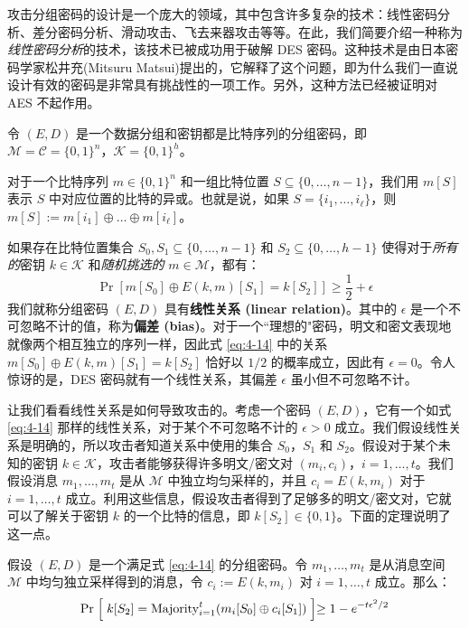 攻击分组密码的设计是一个庞大的领域，其中包含许多复杂的技术：线性密码分析、差分密码分析、滑动攻击、飞去来器攻击等等。在此，我们简要介绍一种称为\emph{线性密码分析}的技术，该技术已被成功用于破解 DES 密码。这种技术是由日本密码学家松井充(Mitsuru Matsui)提出的，它解释了这个问题，即为什么我们一直说设计有效的密码是非常具有挑战性的一项工作。另外，这种方法已经被证明对 AES 不起作用。

\begin{snote}[线性密码分析。]
令 $(E,D)$ 是一个数据分组和密钥都是比特序列的分组密码，即 $\mathcal{M}=\mathcal{C}=\{0,1\}^n$，$\mathcal{K}=\{0,1\}^h$。

对于一个比特序列 $m\in\{0,1\}^n$ 和一组比特位置 $S\subseteq\{0,\dots,n-1\}$，我们用 $m[S]$ 表示 $S$ 中对应位置的比特的异或。也就是说，如果 $S=\{i_1,\dots,i_\ell\}$，则 $m[S]:=m[i_1]\oplus\dots\oplus m[i_\ell]$。

如果存在比特位置集合 $S_0,S_1\subseteq\{0,\dots,n-1\}$ 和 $S_2\subseteq\{0,\dots,h-1\}$ 使得对于\emph{所有的}密钥 $k\in\mathcal{K}$ 和\emph{随机挑选的} $m\in\mathcal{M}$，都有：
\begin{equation}\label{eq:4-14}
\Pr[m[S_0]\oplus E(k,m)[S_1]=k[S_2]]\geq\frac{1}{2}+\epsilon
\end{equation}
我们就称分组密码 $(E,D)$ 具有\textbf{线性关系 (linear relation)}。其中的 $\epsilon$ 是一个不可忽略不计的值，称为\textbf{偏差 (bias)}。对于一个``理想的"密码，明文和密文表现地就像两个相互独立的序列一样，因此式 \ref{eq:4-14} 中的关系 $m[S_0]\oplus E(k,m)[S_1]=k[S_2]$ 恰好以 $1/2$ 的概率成立，因此有 $\epsilon=0$。令人惊讶的是，DES 密码就有一个线性关系，其偏差 $\epsilon$ 虽小但不可忽略不计。

让我们看看线性关系是如何导致攻击的。考虑一个密码 $(E,D)$，它有一个如式 \ref{eq:4-14} 那样的线性关系，对于某个不可忽略不计的 $\epsilon>0$ 成立。我们假设线性关系是明确的，所以攻击者知道关系中使用的集合 $S_0$，$S_1$ 和 $S_2$。假设对于某个未知的密钥 $k\in\mathcal{K}$，攻击者能够获得许多明文/密文对 $(m_i,c_i)$，$i=1,\dots,t$。我们假设消息 $m_1,\dots,m_t$ 是从 $\mathcal{M}$ 中独立均匀采样的，并且 $c_i=E(k,m_i)$ 对于 $i=1,\dots,t$ 成立。利用这些信息，假设攻击者得到了足够多的明文/密文对，它就可以了解关于密钥 $k$ 的一个比特的信息，即 $k[S_2]\in\{0,1\}$。下面的定理说明了这一点。
\end{snote}

\begin{lemma}\label{lemma:4-3}
假设 $(E, D)$ 是一个满足式 \ref{eq:4-14} 的分组密码。令 $m_1,\dots,m_t$ 是从消息空间 $\mathcal{M}$ 中均匀独立采样得到的消息，令 $c_i:=E(k,m_i)$ 对 $i=1,\dots,t$ 成立。那么：
\begin{equation}\label{eq:4-15}
\Pr
\Bigm[
k[S_2]={\rm Majority}^t_{i=1}(m_i[S_0]\oplus c_i[S_1])
\Bigm]
\geq1-e^{-{t\epsilon^2}/{2}}
\end{equation}
\end{lemma}


